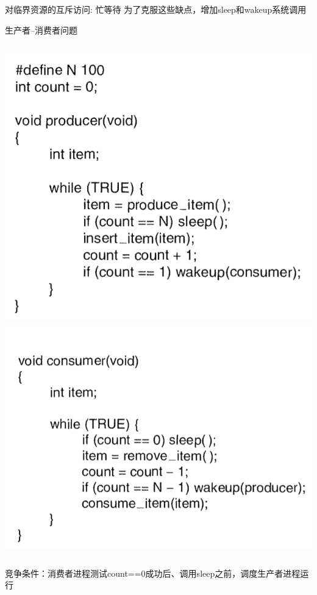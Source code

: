 \documentclass[xcolor=svgnames]{beamer}
\begin{document}
\begin{CJK*}{UTF8}{gbsn}
\begin{frame}{对临界资源的互斥访问: 忙等待}
为了克服这些缺点，增加sleep和wakeup系统调用
\end{frame}

\begin{frame}{生产者--消费者问题}
\begin{columns}[b]
\includegraphics[width=1.0\textwidth]{prod.png}
\includegraphics[width=1.0\textwidth]{consum.png}
\end{columns}%

竞争条件：消费者进程测试count==0成功后、调用sleep之前，调度生产者进程运行
\end{frame}


\end{CJK*}
\end{document}
